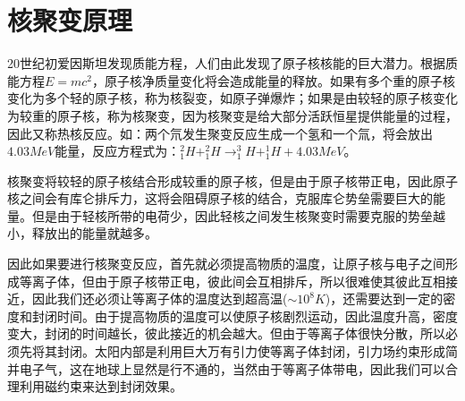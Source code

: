 \chapter{核聚变原理}
20世纪初爱因斯坦发现质能方程，人们由此发现了原子核核能的巨大潜力。根据质能方程$E=mc^{2}$，原子核净质量变化将会造成能量的释放。如果有多个重的原子核变化为多个轻的原子核，称为核裂变，如原子弹爆炸；如果是由较轻的原子核变化为较重的原子核，称为核聚变，因为核聚变是给大部分活跃恒星提供能量的过程，因此又称热核反应。如：两个氘发生聚变反应生成一个氢和一个氚，将会放出$4.03MeV$能量，反应方程式为：$_{1}^{2}H+_{1}^{2}H\rightarrow_{1}^{3}H+_{1}^{1}H+4.03MeV$。


核聚变将较轻的原子核结合形成较重的原子核，但是由于原子核带正电，因此原子核之间会有库仑排斥力，这将会阻碍原子核的结合，克服库仑势垒需要巨大的能量。但是由于轻核所带的电荷少，因此轻核之间发生核聚变时需要克服的势垒越小，释放出的能量就越多。



因此如果要进行核聚变反应，首先就必须提高物质的温度，让原子核与电子之间形成等离子体，但由于原子核带正电，彼此间会互相排斥，所以很难使其彼此互相接近，因此我们还必须让等离子体的温度达到超高温($\sim10^{8}K$)，还需要达到一定的密度和封闭时间。由于提高物质的温度可以使原子核剧烈运动，因此温度升高，密度变大，封闭的时间越长，彼此接近的机会越大。但由于等离子体很快分散，所以必须先将其封闭。太阳内部是利用巨大万有引力使等离子体封闭，引力场约束形成简并电子气，这在地球上显然是行不通的，当然由于等离子体带电，因此我们可以合理利用磁约束来达到封闭效果。